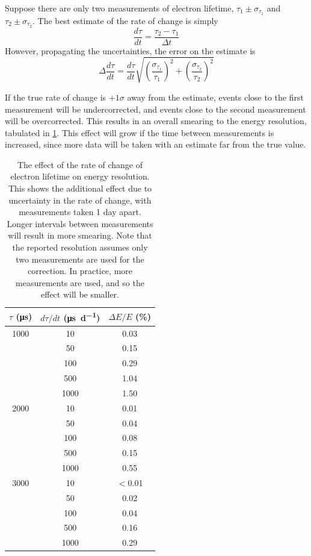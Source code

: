 \documentclass[herrin-thesis.tex]{subfiles}
\begin{document}
Suppose there are only two measurements of electron lifetime, \(\tau_1 \pm \sigma_{\tau_1}\) and \(\tau_2 \pm \sigma_{\tau_2}\). The best estimate of the rate of change is simply
\begin{equation}
\frac{d\tau}{dt} = \frac{\tau_2 - \tau_1}{\Delta t}
\end{equation}
However, propagating the uncertainties, the error on the estimate is
\begin{equation}
\Delta \frac{d\tau}{dt} = \frac{d\tau}{dt}\sqrt{\left(\frac{\sigma_{\tau_1}}{\tau_1}\right)^2 + \left(\frac{\sigma_{\tau_2}}{\tau_2}\right)^2}
\end{equation}

If the true rate of change is \(+1\sigma\) away from the estimate, events close to the first measurement will be undercorrected, and events close to the second measurement will be overcorrected. This results in an overall smearing to the energy resolution, tabulated in \cref{tab:el_res_dtaudt}. This effect will grow if the time between measurements is increased, since more data will be taken with an estimate far from the true value.

\begin{table}[tbp]
\centering
\caption[Effect of electron lifetime time variance on resolution]{The effect of the rate of change of electron lifetime on energy resolution. This shows the additional effect due to uncertainty in the rate of change, with measurements taken 1 day apart. Longer intervals between measurements will result in more smearing. Note that the reported resolution assumes only two measurements are used for the correction. In practice, more measurements are used, and so the effect will be smaller.}
\label{tab:el_res_dtaudt}
\begin{tabular}{c c c}\toprule
	\(\tau\) (\si{\micro\second})	&	\(d\tau/dt\) (\si{\micro\second\per\day})	&	\(\Delta E / E\) (\%) 	\\\midrule
	1000					&	10			&	0.03				\\
						&	50			&	0.15				\\
						&	100			&	0.29				\\
						&	500			&	1.04				\\
						&	1000			&	1.50				\\\midrule
	2000					&	10			&	0.01				\\
						&	50			&	0.04				\\
						&	100			&	0.08				\\
						&	500			&	0.15				\\
						&	1000			&	0.55				\\\midrule
	3000					&	10			&	\(<\)0.01			\\
						&	50			&	0.02				\\
						&	100			&	0.04				\\
						&	500			&	0.16				\\
						&	1000			&	0.29				\\\bottomrule
\end{tabular}
\end{table}
\end{document}
